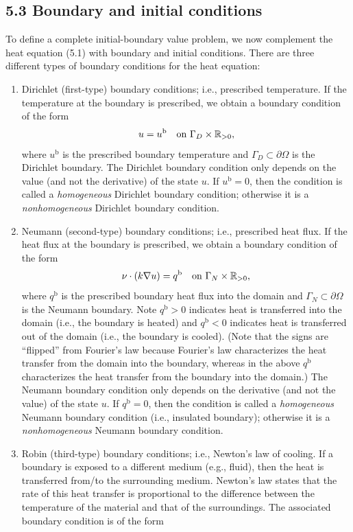 \subsection{5.3 Boundary and initial conditions}
To define a complete initial-boundary value problem, we now complement the heat equation (5.1) with boundary and initial conditions. There are three different types of boundary conditions for the heat equation:
\begin{enumerate}
    \item Dirichlet (first-type) boundary conditions; i.e., prescribed temperature. If the temperature at the boundary is prescribed, we obtain a boundary condition of the form
    \[u = u^{\mathrm{b}} \quad \text{on } \Gamma_D \times \mathbb{R}_{>0},\]
    where $u^{\mathrm{b}}$ is the prescribed boundary temperature and $\Gamma_D \subset \partial\Omega$ is the Dirichlet boundary. The Dirichlet boundary condition only depends on the value (and not the derivative) of the state $u$. If $u^{\mathrm{b}} = 0$, then the condition is called a \textit{homogeneous} Dirichlet boundary condition; otherwise it is a \textit{nonhomogeneous} Dirichlet boundary condition.
    \item Neumann (second-type) boundary conditions; i.e., prescribed heat flux. If the heat flux at the boundary is prescribed, we obtain a boundary condition of the form
    \[\nu \cdot (k \nabla u) = q^{\mathrm{b}} \quad \text{on } \Gamma_N \times \mathbb{R}_{>0},\]
    where $q^{\mathrm{b}}$ is the prescribed boundary heat flux into the domain and $\Gamma_N \subset \partial\Omega$ is the Neumann boundary. Note $q^{\mathrm{b}} > 0$ indicates heat is transferred into the domain (i.e., the boundary is heated) and $q^{\mathrm{b}} < 0$ indicates heat is transferred out of the domain (i.e., the boundary is cooled). (Note that the signs are ``flipped'' from Fourier's law because Fourier's law characterizes the heat transfer from the domain into the boundary, whereas in the above $q^{\mathrm{b}}$ characterizes the heat transfer from the boundary into the domain.) The Neumann boundary condition only depends on the derivative (and not the value) of the state $u$. If $q^{\mathrm{b}} = 0$, then the condition is called a \textit{homogeneous} Neumann boundary condition (i.e., insulated boundary); otherwise it is a \textit{nonhomogeneous} Neumann boundary condition.
    \item Robin (third-type) boundary conditions; i.e., Newton's law of cooling. If a boundary is exposed to a different medium (e.g., fluid), then the heat is transferred from/to the surrounding medium. Newton's law states that the rate of this heat transfer is proportional to the difference between the temperature of the material and that of the surroundings. The associated boundary condition is of the form

\end{enumerate}
